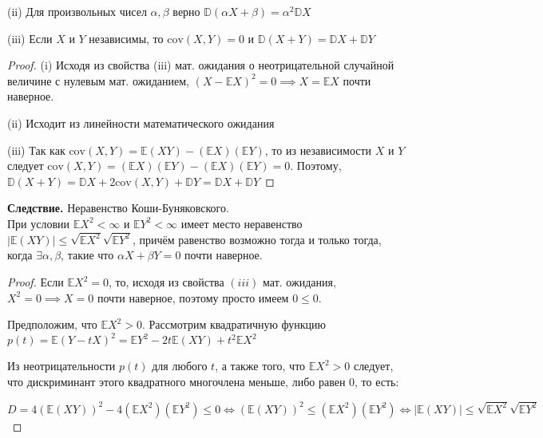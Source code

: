 \documentclass[a4paper]{article}
\begin{document}
\begin{colloq}
\begin{theorem*}
   			(ii) Для произвольных чисел $\alpha, \beta$ верно $\mathbb{D}(\alpha X + \beta) = \alpha^2 \mathbb{D}X$
   			
   			(iii) Если $X$ и $Y$ независимы, то $\mathrm{cov}(X, Y) = 0$ и $\mathbb{D}(X + Y) = \mathbb{D}X + \mathbb{D}Y$
   	\end{theorem*}
   	
   	\begin{proof}
   			(i) Исходя из свойства (iii) мат. ожидания о неотрицательной случайной величине с нулевым мат. ожиданием, $(X - \mathbb{E}X)^2 = 0 \implies X = \mathbb{E}X$ почти наверное.
   			
   			(ii) Исходит из линейности математического ожидания
   			
   			(iii) Так как $\mathrm{\mathrm{cov}}(X, Y) = \mathbb{E}(XY) - (\mathbb{E}X)(\mathbb{E}Y)$, то из независимости
   			$X$ и $Y$ следует $\mathrm{cov}(X, Y) = (\mathbb{E}X)(\mathbb{E}Y) - (\mathbb{E}X)(\mathbb{E}Y) = 0$.
   			Поэтому, $\mathbb{D}(X + Y) = \mathbb{D}X + 2 \mathrm{\mathrm{cov}}(X, Y) + \mathbb{D}Y  = \mathbb{D}X + \mathbb{D}Y$
   	\end{proof}
   	
   	\textbf{Следствие.} Неравенство Коши-Буняковского. \\
   		При условии $\mathbb{E}X^2 < \infty$ и $\mathbb{E}Y^2 < \infty$ имеет место неравенство $\left| \mathbb{E}(XY) \right| \leqslant \sqrt{\mathbb{E}X^2} \sqrt{\mathbb{E}Y^2}$, причём равенство возможно тогда и только тогда, когда $\exists \alpha, \beta$, такие что $\alpha X + \beta Y = 0$ почти наверное.
   	
   	\begin{proof}
   		Если $\mathbb{E}X^2 = 0$, то, исходя из свойства $(iii)$ мат. ожидания, $X^2 = 0 \implies X = 0$ почти наверное,
   		поэтому просто имеем $0 \leqslant 0$.
   		
   		Предположим, что $\mathbb{E}X^2 > 0$. Рассмотрим квадратичную функцию $p(t) = \mathbb{E}(Y - tX)^2 = \mathbb{E}Y^2 - 2t \mathbb{E}(XY) + t^2 \mathbb{E}X^2$
   		
   		Из неотрицательности $p(t)$ для любого $t$, а также того, что $\mathbb{E}X^2 > 0$ следует, что дискриминант этого квадратного многочлена меньше, либо равен 0, то есть:
   		
   		$D = 4 (\mathbb{E}(XY))^2 - 4 (\mathbb{E}X^2) (\mathbb{E} Y^2) \leqslant 0 \iff (\mathbb{E}(XY))^2 \leqslant (\mathbb{E}X^2) (\mathbb{E} Y^2) \iff \left| \mathbb{E}(XY) \right| \leqslant \sqrt{\mathbb{E}X^2} \sqrt{\mathbb{E} Y^2}$
   		

\end{proof}
\end{colloq}
\end{document}
